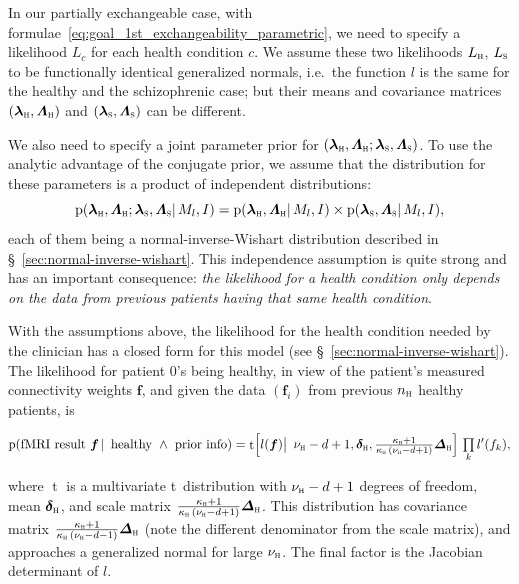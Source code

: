 \documentclass[%
]{frontiersSCNS-nologo} %
\newcommand*{\sect}{\S} %
\newcommand*{\ie}{i.e.}
\newcommand*{\pf}{\mathrm{p}}%
\renewcommand*{\|}{\mathpunct{|}}%
\newcommand*{\bigcond}{\mathpunct{\big|\ }}%
\newcommand*{\Land}{\mathbin{\ \land\ }}
\newcommand*{\Cond}{\mathpunct{\,|\ }}%
\let\oldprod\prod
\renewcommand*{\prod}{\mathop{\textstyle\oldprod}}
\newcommand*{\yh}{c}
\newcommand*{\yhu}{\textsc{h}}
\newcommand*{\yhd}{\textsc{s}}
\newcommand*{\yxx}{f}
\newcommand*{\yx}{\bm{\yxx}}
\newcommand*{\ylm}{\lambda}
\newcommand*{\ylmm}{\bm{\ylm}}
\newcommand*{\yls}{\varLambda}
\newcommand*{\ylss}{\bm{\yls}}
\newcommand*{\yn}{n}
\newcommand*{\ynh}{\yn_{\yhu}}
\newcommand*{\yd}{d}
\newcommand*{\yI}{I}
\newcommand*{\yM}{M}
\newcommand*{\yMl}{\yM_l}
\newcommand*{\ytr}{l}
\newcommand*{\yL}{L}
\DeclareMathOperator{\dstudentt}{t}
\newcommand*{\ymu}{\bm{\delta}}
\newcommand*{\yka}{\kappa}
\newcommand*{\ynu}{\nu}
\newcommand*{\yLa}{\bm{\varDelta}}
\begin{document}
\bigskip

In our partially exchangeable case, with
formulae~\eqref{eq:goal_1st_exchangeability_parametric}, we need to specify
a likelihood $\yL_{\yh}$ for each health condition $\yh$. We assume these
two likelihoods $\yL_{\yhu}$, $\yL_{\yhd}$ to be functionally identical
generalized normals, \ie\ the function $\ytr$ is the same for the healthy
and the schizophrenic case; but their means and covariance matrices
$(\ylmm_{\yhu},\ylss_{\yhu})$ and $(\ylmm_{\yhd},\ylss_{\yhd})$ can be
different.

We also need to specify a joint parameter prior for
$(\ylmm_{\yhu},\ylss_{\yhu}; \ylmm_{\yhd},\ylss_{\yhd})$. To use the
analytic advantage of the conjugate prior, we assume that the distribution
for these parameters is a product of independent distributions:
\begin{equation}
  \label{eq:logit-normal_parameters_factor_condition}
  \pf(\ylmm_{\yhu},\ylss_{\yhu} ;
  \ylmm_{\yhd},\ylss_{\yhd}\| \yMl, \yI)
  = \pf(\ylmm_{\yhu},\ylss_{\yhu} \| \yMl, \yI)\times
  \pf(\ylmm_{\yhd},\ylss_{\yhd}  \| \yMl, \yI),
\end{equation}
each of them being a normal-inverse-Wishart distribution described in
\sect~\ref{sec:normal-inverse-wishart}. This independence assumption is
quite strong and has an important consequence: \emph{the likelihood for a
  health condition only depends on the data from previous patients having
  that same health condition}.

With the assumptions above, the likelihood for the health condition needed
by the clinician has a closed form for this model
(see \sect~\ref{sec:normal-inverse-wishart}). The likelihood for patient $0$'s
being healthy, in view of the patient's measured connectivity weights $\yx$,
and given the data $(\yx_i)$ from previous $\ynh$ healthy patients, is
\begin{shaded}
  \begin{equation}
    \label{eq:final_likelihood}
    \pf(\text{fMRI result $\yx$} \Cond \text{healthy} \Land
    \text{prior info})
    =
    \dstudentt\Bigl[\ytr(\yx) \bigcond \ynu_{\yhu}-\yd+1, \ymu_{\yhu},
    \tfrac{\yka_{\yhu}+1}{\yka_{\yhu}\,(\ynu_{\yhu}-\yd+1)}\yLa_{\yhu} \Bigr]
    \,\oldprod_k\ytr'(\yxx_k),
  \end{equation}
\end{shaded}
\noindent where $\dstudentt$ is a multivariate t~distribution with
$\ynu_{\yhu}-\yd+1$ degrees of freedom, mean $\ymu_{\yhu}$, and scale
matrix $\frac{\yka_{\yhu}+1}{\yka_{\yhu}\,(\ynu_{\yhu}-\yd+1)}\yLa_{\yhu}$.
This distribution has covariance matrix
$\frac{\yka_{\yhu}+1}{\yka_{\yhu}\,(\ynu_{\yhu}-\yd-1)}\yLa_{\yhu}$ (note
the different denominator from the scale matrix), and approaches a
generalized normal for large $\ynu_{\yhu}$. The final factor is the Jacobian
determinant of $\ytr$.
\end{document}
